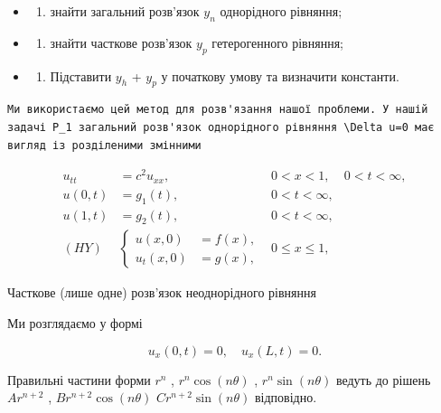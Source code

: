 \documentclass[
  ukrainian,
]{article}
\providecommand{\tightlist}{%
  \setlength{\itemsep}{0pt}\setlength{\parskip}{0pt}}
\begin{document}
\begin{itemize}
\tightlist
\item
  \begin{enumerate}
  \def\labelenumi{\arabic{enumi})}
  \tightlist
  \item
    знайти загальний розв'язок \(y_n\) однорідного рівняння;
  \end{enumerate}
\item
  \begin{enumerate}
  \def\labelenumi{\arabic{enumi})}
  \setcounter{enumi}{1}
  \tightlist
  \item
    знайти часткове розв'язок \(y_p\) гетерогенного рівняння;
  \end{enumerate}
\item
  \begin{enumerate}
  \def\labelenumi{\arabic{enumi})}
  \setcounter{enumi}{2}
  \tightlist
  \item
    Підставити \(y_h\) + \(y_p\) у початкову умову та визначити
    константи.
  \end{enumerate}
\end{itemize}

\begin{verbatim}
Ми використаємо цей метод для розв'язання нашої проблеми. У нашій задачі P_1 загальний розв'язок однорідного рівняння \Delta u=0 має вигляд із розділеними змінними
\end{verbatim}

\[
\begin{aligned} u_{tt} &= c^2 u_{xx}, & 0 < x < 1, & 0 < t < \infty, \\ u(0, t) &= g_1(t), & 0 < t < \infty, \\ u(1, t) &= g_2(t), & 0 < t < \infty, \\ (HY) &\begin{cases} u(x, 0) &= f(x), \\ u_t(x, 0) &= g(x), \end{cases} & 0 \leqslant x \leqslant 1, \end{aligned}
\]

Часткове (лише одне) розв'язок неоднорідного рівняння

Ми розглядаємо у формі

\[
u_x(0, t) = 0, \quad u_x(L, t) = 0.
\]

Правильні частини форми \(r^n\) , \(r^n \cos{(n\theta)}\) ,
\(r^n \sin{(n\theta)}\) ведуть до рішень \(Ar^{n+2}\) ,
\(Br^{n+2} \cos{(n\theta)}\) \(Cr^{n+2} \sin{(n\theta)}\) відповідно.
\end{document}
